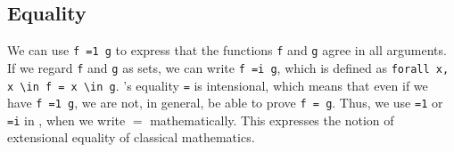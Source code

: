 \subsection{Equality}
We can use \lstinline{f =1 g} to express that the functions \lstinline{f} and \lstinline{g} agree in all arguments.
If we regard \lstinline{f} and \lstinline{g} as sets, we can write \lstinline{f =i g}, which is defined as \lstinline{forall x, x \in f = x \in g}.
\coq's equality \lstinline{=} is intensional, which means that even if we have \lstinline{f =1 g}, we are not, in general, be able to prove \lstinline{f = g}.
Thus, we use \lstinline{=1} or \lstinline{=i} in \coq, when we write $=$ mathematically. 
This expresses the notion of extensional equality of classical mathematics. 



